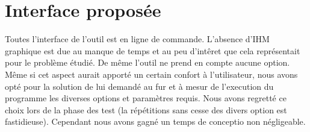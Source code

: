 \section{Interface proposée}
Toutes l'interface de l'outil est en ligne de commande. L'absence d'IHM graphique est due au manque de temps et au peu d'intêret que cela représentait pour le problème étudié. De même l'outil ne prend en compte aucune option. Même si cet aspect aurait apporté un certain confort à l'utilisateur, nous avons opté pour la solution de lui demandé au fur et à mesur de l'execution du programme les diverses options et paramètres requis. Nous avons regretté ce choix lors de la phase des test (la répétitions sans cesse des divers option est fastidieuse). Cependant nous avons gagné un temps de conceptio non négligeable. 


